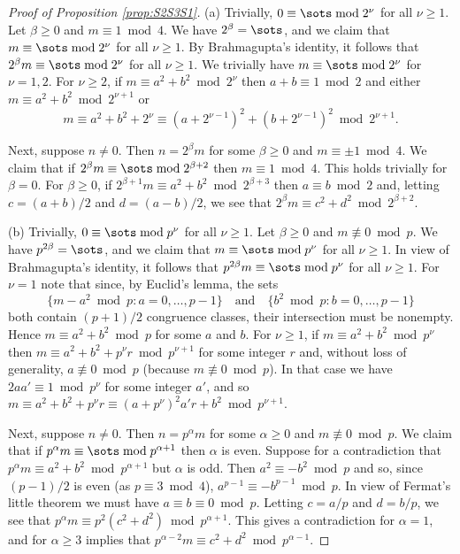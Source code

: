\documentclass[12pt, reqno, twoside, letterpaper]{amsart}
\begin{document}
\begin{nix}
%
\begin{proof}[Proof of Proposition \ref{prop:S2S3S1}] 
%
(a)
%
Trivially, $0 \equiv \sots \bmod 2^{\nu}$ for all $\nu \ge 1$.
%
Let $\beta \ge 0$ and $m \equiv 1 \bmod 4$.
%
We have $2^{\beta} = \sots$, and we claim that 
$m \equiv \sots \bmod 2^{\nu}$ for all $\nu \ge 1$.
%
By Brahmagupta's identity, it follows that 
$2^{\beta}m \equiv \sots \bmod 2^{\nu}$ for all $\nu \ge 1$.
%
We trivially have $m \equiv \sots \bmod 2^{\nu}$ for $\nu = 1,2$.
%
For $\nu \ge 2$, if $m \equiv a^2 + b^2 \bmod 2^{\nu}$ then 
$a + b \equiv 1 \bmod 2$ and either 
$m \equiv a^2 + b^2 \bmod 2^{\nu + 1}$ or 
\[
 m \equiv a^2 + b^2 + 2^{\nu}
    \equiv (a + 2^{\nu - 1})^2 + (b + 2^{\nu - 1})^2
     \bmod 2^{\nu + 1}.
\]

Next, suppose $n \ne 0$.
%
Then $n = 2^{\beta}m$ for some $\beta \ge 0$ and 
$m \equiv \pm 1 \bmod 4$.
%
We claim that if $2^{\beta}m \equiv \sots \bmod 2^{\beta + 2}$ 
then $m \equiv 1 \bmod 4$.
%
This holds trivially for $\beta = 0$.
%
For $\beta \ge 0$, if 
$2^{\beta + 1}m \equiv a^2 + b^2 \bmod 2^{\beta + 3}$ then 
$a \equiv b \bmod 2$ and, letting $c = (a + b)/2$ and 
$d = (a - b)/2$, we see that  
$2^{\beta}m \equiv c^2 + d^2 \bmod 2^{\beta + 2}$.

%
(b)
%
Trivially, $0 \equiv \sots \bmod p^{\nu}$ for all $\nu \ge 1$.
%
Let $\beta \ge 0$ and $m \not\equiv 0 \bmod p$.
%
We have $p^{2\beta} = \sots$, and we claim that 
$m \equiv \sots \bmod p^{\nu}$ for all $\nu \ge 1$.
%
In view of Brahmagupta's identity, it follows that 
$p^{2\beta}m \equiv \sots \bmod p^{\nu}$ for all $\nu \ge 1$.
%
For $\nu = 1$ note that since, by Euclid's lemma, the sets 
\[
 \{m - a^2 \bmod p : a = 0,\ldots,p - 1\}
  \quad 
   \text{and} 
    \quad 
     \{b^2 \bmod p : b = 0,\ldots,p - 1\}
\]
both contain $(p + 1)/2$ congruence classes, their intersection 
must be nonempty.
%
Hence $m \equiv a^2 + b^2 \bmod p$ for some $a$ and $b$.
%
For $\nu \ge 1$, if $m \equiv a^2 + b^2 \bmod p^{\nu}$ then 
$m \equiv a^2 + b^2 + p^{\nu}r \bmod p^{\nu + 1}$ for some integer 
$r$ and, without loss of generality, $a \not\equiv 0 \bmod p$ 
(because  $m \not\equiv 0 \bmod p$).
%
In that case we have $2aa' \equiv 1 \bmod p^{\nu}$ for some 
integer $a'$, and so
$
  m \equiv a^2 + b^2 + p^{\nu}r
     \equiv (a + p^{\nu})^2a'r + b^2 
      \bmod p^{\nu + 1}
$.

Next, suppose $n \ne 0$.
%
Then $n = p^{\alpha}m$ for some $\alpha \ge 0$ and 
$m \not\equiv 0 \bmod p$.
%
We claim that if $p^{\alpha}m \equiv \sots \bmod p^{\alpha + 1}$ 
then $\alpha$ is even.
%
Suppose for a contradiction that 
$p^{\alpha}m \equiv a^2 + b^2 \bmod p^{\alpha + 1}$ but 
$\alpha$ is odd.
%
Then $a^2 \equiv -b^2 \bmod p$ and so, since $(p - 1)/2$ is even 
(as $p \equiv 3 \bmod 4$), $a^{p - 1} \equiv -b^{p - 1} \bmod p$.
%
In view of Fermat's little theorem we must have 
$a \equiv b \equiv 0 \bmod p$.
%
Letting $c = a/p$ and $d = b/p$, we see that 
$p^{\alpha}m \equiv p^2(c^2 + d^2) \bmod p^{\alpha + 1}$.
%
This gives a contradiction for $\alpha = 1$, and for 
$\alpha \ge 3$ implies that 
$p^{\alpha - 2}m \equiv c^2 + d^2 \bmod p^{\alpha - 1}$.


\end{proof}
\end{nix}
\end{document}
